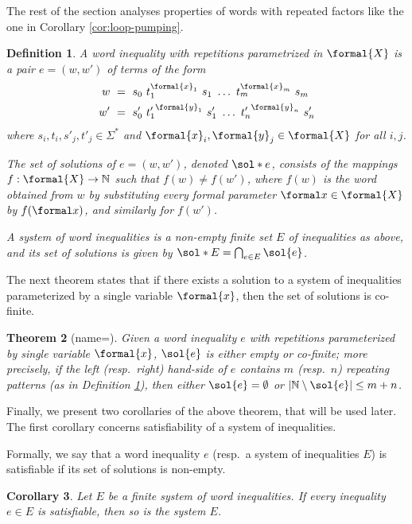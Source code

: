 \documentclass{article}
\newtheorem{theorem}{Theorem}\newtheorem{lemma}[theorem]{Lemma}\newtheorem{proposition}[theorem]{Proposition}\newtheorem{corollary}[theorem]{Corollary}\newtheorem{definition}[theorem]{Definition}\newtheorem{claim}[theorem]{Claim}\newtheorem{remark}[theorem]{Remark}\newtheorem{example}[theorem]{Example}\newtheorem*{claim*}{Claim}
\providecommand{\AP}{}\NewDocumentCommand{\reintro}{o m}{#2}
\begin{document}
The rest of the section analyses properties of words
with repeated factors like the one in Corollary \ref{cor:loop-pumping}.

\begin{definition}\label{def:word-equation}
A word inequality with repetitions parametrized in 
$\formal{X}$ %
is a pair $e = (w, w')$ of terms of the form
\begin{align*}
w &~=~ s_0 ~ t_1^{\formal{x}_1} ~ s_1 ~ \dots ~ t_m^{\formal{x}_m} ~ s_m \\
w' &~=~ s'_0 ~ {t'_1}^{\formal{y}_1} ~ s'_1 ~ \dots ~
{t'_n}^{\formal{y}_n} ~ {s'_n}
\end{align*}
where $s_i,t_i, s'_j, t'_j \in \Sigma^*$ and 
$\formal{x}_i, \formal{y}_j \in \formal{X}$
for all $i,j$.
\AP
The set of solutions of $e = (w,w')$, denoted $\reintro[solutions]{\sol*{e}}$, 
consists of the mappings $f:\formal{X}\rightarrow\mathbb{N}$ 
such that $f(w) \neq f(w')$, where $f(w)$ is the word obtained 
from $w$ by substituting every formal parameter $\formal x\in\formal{X}$ 
by $f(\formal x)$, and similarly for $f(w')$.
\AP
A system of word inequalities 
is a non-empty finite set $E$ of inequalities as above,
and its set of solutions is given by
$\reintro[solutions]{\sol*{E}} = \bigcap_{e\in E} \sol{e}$.
\end{definition}

The next theorem states that if there exists a solution to a system of inequalities parameterized by a single 
variable $\formal{x}$, then the set of solutions is co-finite. 

\begin{theorem}[name={\cite[Theorem 4.3]{Saarela15}}]\label{thm:saarela}
Given a word inequality $e$ with repetitions parameterized by single 
variable $\formal{x}$,
$\sol{e}$ is either empty or co-finite; more precisely,
if the left (resp.~right) hand-side of $e$ contains $m$ (resp.~$n$)
repeating patterns (as in Definition \ref{def:word-equation}),
then either $\sol{e} = \emptyset$ or $|\mathbb{N} \setminus \sol{e}| \le m+n$.
\end{theorem}

Finally, we present two corollaries of the above theorem, 
that will be used later. 
The first corollary concerns satisfiability of a system of inequalities.
\AP
Formally, we say that a word inequality $e$ 
(resp.~a system of inequalities $E$) 
is satisfiable if its set of solutions is non-empty.


\begin{corollary}\label{cor:saarela1}
Let $E$ be a finite system of word inequalities.
If every inequality $e\in E$ is satisfiable, then so is the system $E$.
\end{corollary}
\end{document}
